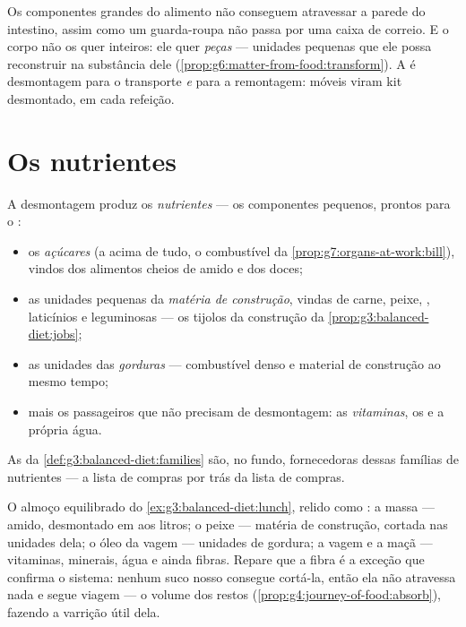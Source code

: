 \begin{remark}\label{rem:g7:digestion-and-nutrients:why}
Os componentes grandes do alimento não conseguem atravessar a parede do
intestino, assim como um guarda-roupa não passa por uma caixa de
correio. E o corpo não os quer inteiros: ele quer \emph{peças} ---
unidades pequenas que ele possa reconstruir na substância dele
(\cref{prop:g6:matter-from-food:transform}). A  é desmontagem
para o transporte \emph{e} para a remontagem: móveis viram kit
desmontado, em cada refeição.
\end{remark}

\section{Os nutrientes}

\begin{definition}\label{def:g7:digestion-and-nutrients:families}
A desmontagem produz os \emph{nutrientes} --- os
componentes pequenos, prontos para o :
\begin{itemize}
  \item os \emph{açúcares} (a  acima de tudo, o combustível da
        \cref{prop:g7:organs-at-work:bill}), vindos dos alimentos
        cheios de amido e dos doces;
  \item as unidades pequenas da \emph{matéria de construção}, vindas
        de carne, peixe, , laticínios e leguminosas --- os tijolos
        da construção da \cref{prop:g3:balanced-diet:jobs};
  \item as unidades das \emph{gorduras} --- combustível denso e
        material de construção ao mesmo tempo;
  \item mais os passageiros que não precisam de desmontagem: as
        \emph{vitaminas}, os \emph{} e a própria água.
\end{itemize}
As  da \cref{def:g3:balanced-diet:families} são,
no fundo, fornecedoras dessas famílias de nutrientes --- a lista de
compras por trás da lista de compras.
\end{definition}

\begin{example}\label{ex:g7:digestion-and-nutrients:lunch}
O almoço equilibrado do \cref{ex:g3:balanced-diet:lunch}, relido como
: a massa --- amido, desmontado em  aos litros; o
peixe --- matéria de construção, cortada nas unidades dela; o óleo da
vagem --- unidades de gordura; a vagem e a maçã --- vitaminas,
minerais, água e ainda fibras. Repare que a fibra é a exceção que
confirma o sistema: nenhum suco nosso consegue cortá-la, então ela não
atravessa nada e segue viagem --- o volume dos restos
(\cref{prop:g4:journey-of-food:absorb}), fazendo a varrição útil dela.
\end{example}

